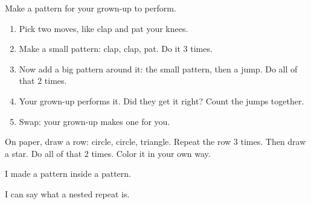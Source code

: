 
\begin{playathome}
Make a pattern for your grown-up to perform.
\begin{enumerate}[leftmargin=1.4em,itemsep=2pt]
  \item Pick two moves, like clap and pat your knees.
  \item Make a small pattern: clap, clap, pat. Do it 3 times.
  \item Now add a big pattern around it: the small pattern, then a jump. Do all of that 2 times.
  \item Your grown-up performs it. Did they get it right? Count the jumps together.
  \item Swap: your grown-up makes one for you.
\end{enumerate}
\end{playathome}

\begin{playathome}
On paper, draw a row: circle, circle, triangle. Repeat the row 3 times. Then draw a star. Do all of that 2 times. Color it in your own way.
\end{playathome}

\begin{selfcheck}
  \item I made a pattern inside a pattern.
  \item I can say what a nested repeat is.
\end{selfcheck}
